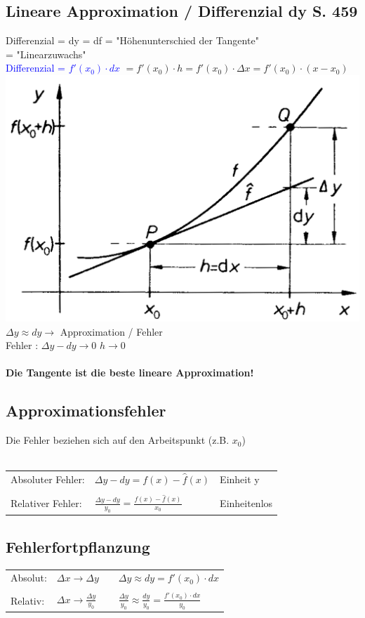 			\subsection{Lineare Approximation / Differenzial dy S. 459}
			Differenzial = dy = df = "Höhenunterschied der Tangente" \\
			= "Linearzuwachs" \\
			\textcolor{blue}{Differenzial = $f'(x_0) \cdot dx$} $= f'(x_0) \cdot h = f'(x_0) \cdot \Delta x = f'(x_0) \cdot (x- x_0) $ \\
			\includegraphics[width=0.8\linewidth]{Bilder/differenzial}  \\
			$\Delta y \approx dy \rightarrow$ Approximation / Fehler \\
			Fehler : \quad $\Delta y - dy \rightarrow 0$ \quad $h \rightarrow 0$ \\	
			\\
			\textbf{Die Tangente ist die beste lineare Approximation!}		
			
			
			\subsection{Approximationsfehler}
			Die Fehler beziehen sich auf den Arbeitspunkt (z.B. $x_0$) \\
			\\
			\begin{tabular}{lll}
			Absoluter Fehler: & $\Delta y - dy = f(x) - \hat f(x)$ & Einheit y \\
			\\
			Relativer Fehler: & $\frac{\Delta y - dy}{y_0} = \frac{f(x) - \hat f(x)}{x_0} $ & Einheitenlos \\
			\end{tabular}
			
			
			\subsection{Fehlerfortpflanzung} 
			\begin{tabular}{llll}
			Absolut: & $\Delta x \rightarrow \Delta y$ & &
			$\Delta y \approx dy = f'(x_0) \cdot dx$ \\
			\\
			Relativ: & $\Delta x \rightarrow \frac{\Delta y}  {y_0}$ & &  $\frac{\Delta y}  {y_0} \approx \frac{dy}{y_0} = \frac{f'(x_0) \cdot dx}{y_0} $ \\
			\end{tabular}
			 \\

